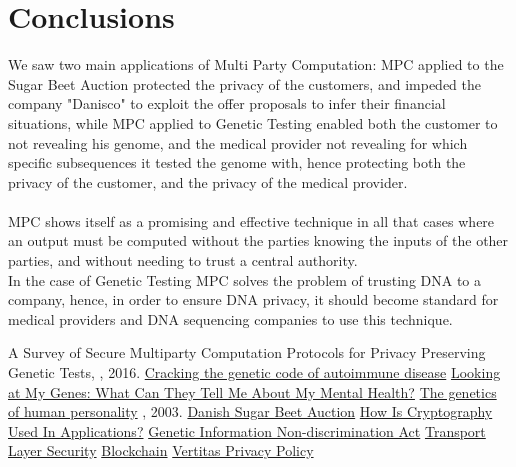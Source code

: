 \documentclass[12pt]{article}
\begin{document}
\section{Conclusions}
We saw two main applications of Multi Party Computation: MPC applied to the Sugar Beet Auction protected the privacy of the customers, and impeded the company "Danisco" to exploit the offer proposals to infer their financial situations, while 
MPC applied to Genetic Testing enabled both the customer to not revealing his genome, and the medical provider not revealing for which specific subsequences it tested the genome with, hence protecting both the privacy of the customer, and the privacy of the medical provider.\\
\\
MPC shows itself as a promising and effective technique in all that cases where an output must be computed without the parties knowing the inputs of the other parties, and without needing to trust a central authority.\\
In the case of Genetic Testing MPC solves the problem of trusting DNA to a company, hence, in order to ensure DNA privacy, it should become standard for medical providers and DNA sequencing companies to use this technique.


\begin{thebibliography}{10}
A Survey of Secure Multiparty Computation Protocols for Privacy Preserving Genetic Tests, 
, 2016.
\href{https://www.nature.com/articles/d41586-021-01839-6}{Cracking the genetic code of autoimmune disease}
\href{https://www.nimh.nih.gov/health/publications/looking-at-my-genes}{Looking at My Genes: What Can They Tell Me About My Mental Health?}
\href{https://pubmed.ncbi.nlm.nih.gov/29152902/}{The genetics of human personality}
, 2003.
\href{https://en.wikipedia.org/wiki/Danish_Sugar_Beet_Auction}{Danish Sugar Beet Auction}
\href{https://resources.infosecinstitute.com/topic/how-is-cryptography-used-in-applications/}{How Is Cryptography Used In Applications?}
\href{https://www.genome.gov/about-genomics/policy-issues/Genetic-Discrimination}{Genetic Information Non-discrimination Act}
\href{https://it.wikipedia.org/wiki/Transport_Layer_Security}{Transport Layer Security}
\href{https://it.wikipedia.org/wiki/Blockchain}{Blockchain}
\href{https://veritas.azureedge.net/cdn/website/2023/01/63ca8df50b7a5-63ca8df50b7a6Veritas-Genetics-Privacy-Notice.pdf.pdf}{Vertitas Privacy Policy}
\end{thebibliography}
\end{document}
